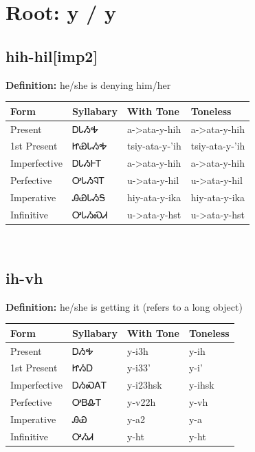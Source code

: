 \documentclass{article}%
\begin{document}
%
\normalsize%
\section*{Root: y / y}%
\subsection*{hih-hil[imp2]}%
\textbf{Definition: }%
he/she is denying him/her%
\\[0.5em]%
\begin{tabular}{|l|l|l|l|}%
\hline%
\textbf{Form}&\textbf{Syllabary}&\textbf{With Tone}&\textbf{Toneless}\\%
\hline%
Present&ᎠᏓᏱᎭ&a{-}>ata{-}y{-}hih&a{-}>ata{-}y{-}hih\\%
1st Present&ᏥᏯᏓᏱᎭ&tsiy{-}ata{-}y{-}'ih&tsiy{-}ata{-}y{-}'ih\\%
Imperfective&ᎠᏓᏱᎰᎢ&a{-}>ata{-}y{-}hih&a{-}>ata{-}y{-}hih\\%
Perfective&ᎤᏓᏱᎸᎢ&u{-}>ata{-}y{-}hil&u{-}>ata{-}y{-}hil\\%
Imperative&ᎯᏯᏓᏱᎦ&hiy{-}ata{-}y{-}ika&hiy{-}ata{-}y{-}ika\\%
Infinitive&ᎤᏓᏱᏍᏗ&u{-}>ata{-}y{-}hst&u{-}>ata{-}y{-}hst\\%
\hline%
\end{tabular}%
\\[1em]%
\subsection*{ih-vh}%
\textbf{Definition: }%
he/she is getting it (refers to a long object)%
\\[0.5em]%
\begin{tabular}{|l|l|l|l|}%
\hline%
\textbf{Form}&\textbf{Syllabary}&\textbf{With Tone}&\textbf{Toneless}\\%
\hline%
Present&ᎠᏱᎭ&y{-}i3h&y{-}ih\\%
1st Present&ᏥᏱᎠ&y{-}i33'&y{-}i'\\%
Imperfective&ᎠᏱᏍᎪᎢ&y{-}i23hsk&y{-}ihsk\\%
Perfective&ᎤᏴᎲᎢ&y{-}v22h&y{-}vh\\%
Imperative&ᎯᏯ&y{-}a2&y{-}a\\%
Infinitive&ᎤᏱᏗ&y{-}ht&y{-}ht\\%
\hline%
\end{tabular}%
\\[1em]%
\end{document}
